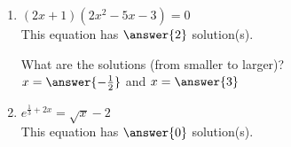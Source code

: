 \documentclass{ximera}
\begin{document}
\begin{exercise}
\begin{enumerate}
\item $(2x+1)(2x^2-5x-3)=0$ \\
This equation has $\answer{2}$ solution(s).
\begin{exercise}
What are the solutions (from smaller to larger)?\\
$x=\answer{-\frac{1}{2}}$ and $x=\answer{3}$
\end{exercise}

\item $e^{\frac{1}{3} + 2x}=\sqrt{x}-2$ \\
This equation has $\answer{0}$ solution(s).



\end{enumerate}
\end{exercise}
\end{document}
